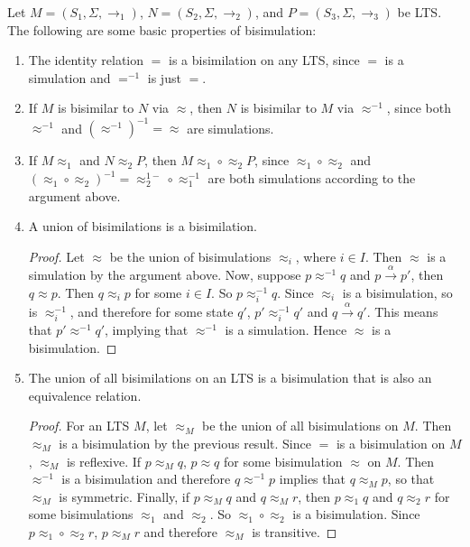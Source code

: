 \documentclass[12pt]{article}
\begin{document}
Let $M=(S_1,\Sigma,\rightarrow_1)$, $N=(S_2,\Sigma,\rightarrow_2)$, and $P=(S_3,\Sigma,\rightarrow_3)$ be LTS.  The following are some basic properties of bisimulation:
\begin{enumerate}
\item The identity relation $=$ is a bisimilation on any LTS, since $=$ is a simulation and $=^{-1}$ is just $=$.
\item If $M$ is bisimilar to $N$ via $\approx$, then $N$ is bisimilar to $M$ via $\approx^{-1}$, since both $\approx^{-1}$ and $(\approx^{-1})^{-1} = \approx$ are simulations.
\item If $M\approx_1$ and $N\approx_2 P$, then $M \approx_1 \circ \approx_2 P$, since $\approx_1 \circ \approx_2$ and $(\approx_1 \circ \approx_2)^{-1} = \approx_2^{1-}\circ \approx_1^{-1}$ are both simulations according to the argument above.
\item A union of bisimilations is a bisimilation.
\begin{proof}
Let $\approx$ be the union of bisimulations $\approx_i$, where $i\in I$.  Then $\approx$ is a simulation by the argument above.  Now, suppose $p \approx^{-1} q$ and $p\stackrel{\alpha}{\rightarrow} p'$, then $q\approx p$.  Then $q\approx_i p$ for some $i \in I$.  So $p \approx_i^{-1} q$.  Since $\approx_i$ is a bisimulation, so is $\approx_i^{-1}$, and therefore for some state $q'$, $p' \approx_i^{-1} q'$ and $q \stackrel{\alpha}{\rightarrow} q'$.  This means that $p' \approx^{-1} q'$, implying that $\approx^{-1}$ is a simulation.  Hence $\approx$ is a bisimulation.
\end{proof}
\item The union of all bisimilations on an LTS is a bisimulation that is also an equivalence relation.
\begin{proof}
For an LTS $M$, let $\approx_M$ be the union of all bisimulations on $M$.  Then $\approx_M$ is a bisimulation by the previous result.  Since $=$ is a bisimulation on $M$, $\approx_M$ is reflexive.  If $p \approx_M q$, $p\approx q$ for some bisimulation $\approx$ on $M$.  Then $\approx^{-1}$ is a bisimulation and therefore $q\approx^{-1} p$ implies that $q\approx_M p$, so that $\approx_M$ is symmetric.  Finally, if $p \approx_M q$ and $q\approx_M r$, then $p\approx_1 q$ and $q\approx_2 r$ for some bisimulations $\approx_1$ and $\approx_2$.  So $\approx_1 \circ \approx_2$ is a bisimulation.  Since $p \approx_1 \circ \approx_2 r$, $p \approx_M r$ and therefore $\approx_M$ is transitive.
\end{proof}
\end{enumerate}
\end{document}

